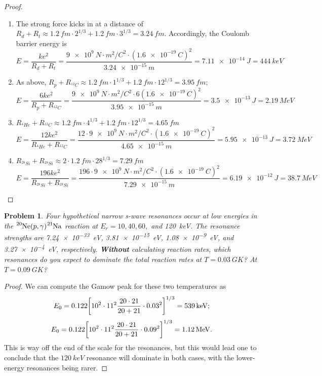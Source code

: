 \documentclass{article}
\newtheorem{plm}{Problem}
\begin{document}
\begin{proof} \;
  \begin{enumerate}
  \item The strong force kicks in at a distance of $R_{d} + R_{t} \approx \SI{1.2}{fm} \cdot 2^{1/3} + \SI{1.2}{fm} \cdot 3^{1/3}
    = \SI{3.24}{fm}$.
    Accordingly, the Coulomb barrier energy is
    \[
      E = \frac{ke^{2}}{R_{d} + R_{t}} = \frac{\SI{9e9}{N \cdot m^{2}/ C^{2}} \cdot (\SI{1.6e-19}{C})^{2}}{\SI{3.24e-15}{m}}
      = \SI{7.11e-14}{J} = \SI{444}{keV}
    \]
  \item As above, $R_{p} + R_{^{12}C} \approx \SI{1.2}{fm} \cdot 1^{1/3} + \SI{1.2}{fm} \cdot 12^{1/3} = \SI{3.95}{fm}$;
    \[
      E = \frac{6ke^{2}}{R_{p} + R_{^{12}C}} = \frac{\SI{9e9}{N \cdot m^{2}/C^{2}} \cdot 6(\SI{1.6e-19}{C})^{2}}{\SI{3.95e-15}{m}}
      = \SI{3.5e-13}{J} = \SI{2.19}{MeV}
    \]
  \item $R_{^{4}He} + R_{^{12}C} \approx \SI{1.2}{fm} \cdot 4^{1/3} + \SI{1.2}{fm} \cdot 12^{1/3} = \SI{4.65}{fm}$
    \[
      E = \frac{12ke^{2}}{R_{^{4}He} + R_{^{12}C}} = \frac{12 \cdot \SI{9e9}{N \cdot m^{2}/C^{2}} \cdot (\SI{1.6e-19}{C})^2}{\SI{4.65e-15}{m}}
      = \SI{5.95e-13}{J} = \SI{3.72}{MeV}
    \]
  \item $R_{^{28}Si} + R_{^{28}Si} \approx 2 \cdot \SI{1.2}{fm} \cdot 28^{1/3} = \SI{7.29}{fm}$
    \[
      E = \frac{196ke^{2}}{R_{^{28}Si} + R_{^{28}Si}} = \frac{196 \cdot \SI{9e9}{N\cdot m^{2}/C^{2}}\cdot(\SI{1.6e-19}{C})^2}{\SI{7.29e-15}{m}}
      = \SI{6.19e-12}{J} = \SI{38.7}{MeV}
    \]
  \end{enumerate}
\end{proof}

\begin{plm}
  Four hypothetical narrow s-wave resonances occur at low energies in the $\ce{^{20}Ne}(p, \gamma)\ce{^{21}Na}$ reaction
  at $E_{r}= 10, 40, 60,$ and \SI{120}{keV}.
  The resonance strengths are \SI{7.24e-33}{eV}, \SI{3.81e-15}{eV}, \SI{1.08e-9}{eV}, and \SI{3.27e-4}{eV}, respectively.
  \textbf{Without} calculating reaction rates, which resonances do you expect to dominate the total reaction rates at $T = \SI{0.03}{GK}$?
  At $T = \SI{0.09}{GK}$?
\end{plm}

\begin{proof}
  We can compute the Gamow peak for these two temperatures as
  \[
    E_{0} = 0.122\qty[10^{2} \cdot 11^{2} \frac{20 \cdot 21}{20 + 21} \cdot 0.03^{2}]^{1/3}
    = \SI{539}{keV};
  \]
  \[
    E_{0} = 0.122\qty[10^{2} \cdot 11^{2} \frac{20 \cdot 21}{20 + 21} \cdot 0.09^{2}]^{1/3}
    =  \SI{1.12}{MeV}.
  \]
  This is way off the end of the scale for the resonances, but this would lead one to conclude that the $\SI{120}{keV}$ resonance
  will dominate in both cases, with the lower-energy resonances being rarer.
\end{proof}
\end{document}
